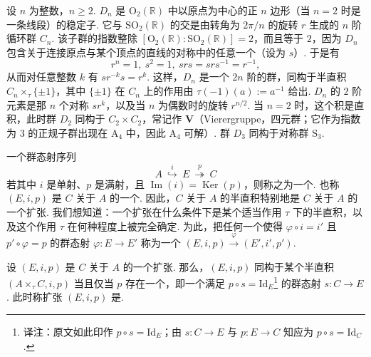 \begin{numpara}[例：二面体群]\label{np:fg-2-2-5}
设 $n$ 为整数，$n\geqslant 2$.  $D_n$ 是 $\mathrm{O}_2(\mathbb{R})$ 中以原点为中心的正 $n$ 边形（当 $n=2$ 时是一条线段）的稳定子. 它与 $\mathrm{SO}_2(\mathbb{R})$ 的交是由转角为 $2\pi/n$ 的旋转 $r$ 生成的 $n$ 阶循环群 $C_n$. 该子群的指数整除 $[\mathrm{O}_2(\mathbb{R}):\mathrm{SO}_2(\mathbb{R})]=2$，而且等于 $2$，因为 $D_n$ 包含关于连接原点与某个顶点的直线的对称中的任意一个（设为 $s$）. 于是有
\[
r^n=1,\ s^2=1,\ srs=srs^{-1}=r^{-1},
\]
从而对任意整数 $k$ 有 $sr^{-k}s=r^k$. 这样，$D_n$ 是一个 $2n$ 阶的群，同构于半直积 $C_n\times_\tau\{\pm1\}$，其中 $\{\pm1\}$ 在 $C_n$ 上的作用由 $\tau(-1)(a):=a^{-1}$ 给出. $D_n$ 的 $2$ 阶元素是那 $n$ 个对称 $sr^k$，以及当 $n$ 为偶数时的旋转 $r^{n/2}$. 当 $n=2$ 时，这个积是直积，此时群 $D_2$ 同构于 $C_2\times C_2$，常记作 $\mathbf{V}$（Vierergruppe，四元群；它作为指数为 $3$ 的正规子群出现在 $\mathrm{A}_4$ 中，因此 $\mathrm{A}_4$ 可解）. 群 $D_3$ 同构于对称群 $\mathrm{S}_3$.
\end{numpara}
\begin{numpara}[扩张]\label{np:fg-2-2-6}
一个群态射序列
\[
A\ \stackrel{i}{\hookrightarrow}\ E\ \stackrel{p}{\twoheadrightarrow}\ C
\]
若其中 $i$ 是单射、$p$ 是满射，且 $\operatorname{Im}(i)=\operatorname{Ker}(p)$，则称之为一个. 也称 $(E,i,p)$ 是 $C$ 关于 $A$ 的一个. 因此，$C$ 关于 $A$ 的半直积特别地是 $C$ 关于 $A$ 的一个扩张. 我们想知道：一个扩张在什么条件下是某个适当作用 $\tau$ 下的半直积，以及这个作用 $\tau$ 在何种程度上被完全确定. 为此，把任何一个使得 $\varphi\circ i=i'$ 且 $p'\circ\varphi=p$ 的群态射 $\varphi:E\longrightarrow E'$ 称为一个 $(E,i,p)\xrightarrow{\ \varphi\ }(E',i',p')$.
\end{numpara}
\begin{proposition}\label{prop:fg-2-2-7}
设 $(E,i,p)$ 是 $C$ 关于 $A$ 的一个扩张. 那么，$(E,i,p)$ 同构于某个半直积 $(A\times_\tau C,i,p)$ 当且仅当 $p$ 存在一个，即一个满足 $p\circ s=\mathrm{Id}_E$\footnote{译注：原文如此印作 $p\circ s=\mathrm{Id}_E$；由 $s:C\longrightarrow E$ 与 $p:E\longrightarrow C$ 知应为 $p\circ s=\mathrm{Id}_C$.} 的群态射 $s:C\longrightarrow E$. 此时称扩张 $(E,i,p)$ 是.
\end{proposition}
